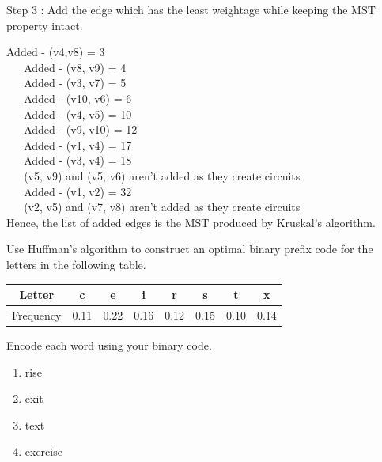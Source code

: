 \documentclass[addpoints,11pt]{exam}
\begin{document}
\begin{questions}
\begin{solutionorbox}
Step 3 : Add the edge which has the least weightage while keeping the MST property intact. 

 Added - (v4,v8) = 3\\
$\hspace{15pt}$ Added - (v8, v9) = 4\\
$\hspace{15pt}$ Added - (v3, v7) = 5\\
$\hspace{15pt}$ Added - (v10, v6) = 6\\
$\hspace{15pt}$ Added - (v4, v5) = 10\\
$\hspace{15pt}$ Added - (v9, v10) = 12\\
$\hspace{15pt}$ Added - (v1, v4) = 17\\
$\hspace{15pt}$ Added - (v3, v4) = 18\\
$\hspace{15pt}$ (v5, v9) and (v5, v6) aren't added as they create circuits \\
$\hspace{15pt}$ Added - (v1, v2) = 32\\
$\hspace{15pt}$ (v2, v5) and (v7, v8) aren't added as they create circuits \\

Hence,  the list of added edges is the MST produced by Kruskal's algorithm.

\end{solutionorbox}

\ifprintanswers
\newpage
\else
\bigskip
\fi


%
%
\question[10]
Use Huffman's algorithm to construct an optimal binary prefix code for the letters in the following table.

\begin{tabular}{|c|c|c|c|c|c|c|c|}
	\hline
	Letter    & c    & e    & i    & r    & s    & t    & x    \\ \hline
	Frequency & 0.11 & 0.22 & 0.16 & 0.12 & 0.15 & 0.10 & 0.14 \\ \hline
\end{tabular}

Encode each word using your binary code.
\begin{enumerate}
	\item rise
	\item exit
	\item text
	\item exercise
\end{enumerate}


\end{questions}
\end{document}
